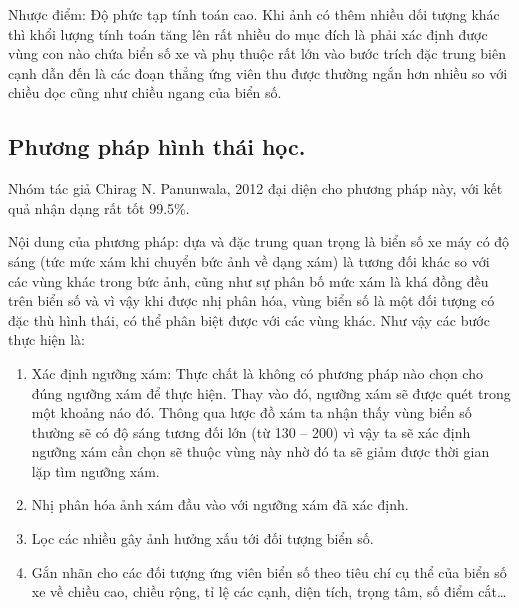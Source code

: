 	    Nhược điểm: Độ phức tạp tính toán cao. Khi ảnh có thêm nhiều dối tượng khác thì khổi lượng tính toán tăng lên rất nhiều do mục đích là phải xác định được vùng con nào chứa biển số xe và phụ thuộc rất lớn vào bước trích đặc trung biên cạnh dẫn đến là các đoạn thẳng ứng viên thu được thường ngắn hơn nhiều so với chiều dọc cũng như chiều ngang của biển số.
	    \subsection{Phương pháp hình thái học.}
	    Nhóm tác giả Chirag N. Panunwala, 2012 đại diện cho phương pháp này, với kết quả nhận dạng rất tốt 99.5\%.
	    
	    Nội dung của phương pháp: dựa và đặc trung quan trọng là biển số xe máy có độ sáng (tức mức xám khi chuyển bức ảnh về dạng xám) là tương đối khác so với các vùng khác trong bức ảnh, cũng như sự phân bố mức xám là khá đồng đều trên biển số và vì vậy khi được nhị phân hóa, vùng biển số là một đối tượng có đặc thù hình thái, có thể phân biệt được với các vùng khác. Như vậy các bước thực hiện là:
	    \begin{enumerate}
	        \item Xác định ngưỡng xám: Thực chất là không có phương pháp nào chọn cho đúng ngưỡng xám để thực hiện. Thay vào đó, ngưỡng xám sẽ được quét trong một khoảng náo đó. Thông qua lược đồ xám ta nhận thấy vùng biển số thường sẽ có độ sáng tương đối lớn (từ 130 – 200) vì vậy ta sẽ xác định ngưỡng xám cần chọn sẽ thuộc vùng này nhờ đó ta sẽ giảm được thời gian lặp tìm ngưỡng xám.
            \item Nhị phân hóa ảnh xám đầu vào với ngưỡng xám đã xác định.
            \item Lọc các nhiều gây ảnh hưởng xấu tới đối tượng biển số.
            \item Gắn nhãn cho các đối tượng ứng viên biển số theo tiêu chí cụ thể của biển số xe về chiều cao, chiều rộng, tỉ lệ các cạnh, diện tích, trọng tâm, số điểm cắt…
	    \end{enumerate}
